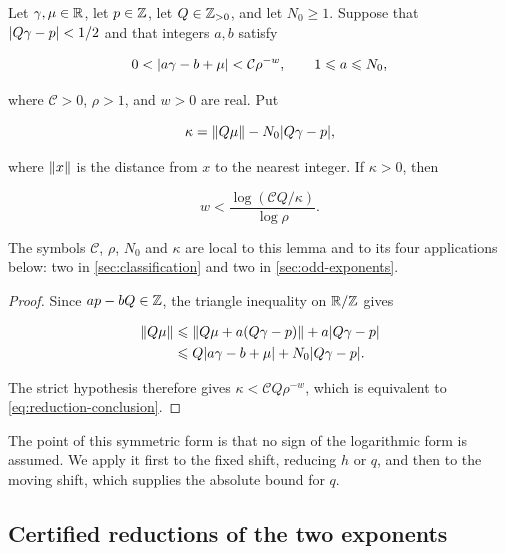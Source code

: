 \begin{lemma}
\label{lem:absolute-reduction}
Let $\gamma,\mu\in\mathbb{R}$, let $p\in\mathbb{Z}$, let $Q\in\mathbb{Z}_{>0}$, and let
$N_0\geqslant1$. Suppose that $\lvert Q\gamma-p\rvert<1/2$ and that integers
$a,b$ satisfy

\begin{equation}
 0<\lvert a\gamma-b+\mu\rvert<\mathcal C\rho^{-w},
 \qquad
 1\leqslant a\leqslant N_0,
 \label{eq:reduction-hypothesis}
\end{equation}

where $\mathcal C>0$, $\rho>1$, and $w>0$ are real. Put

\begin{equation}
 \kappa=\left\lVert Q\mu\right\rVert-N_0\lvert Q\gamma-p\rvert,
 \label{eq:eta}
\end{equation}

where $\left\lVert x\right\rVert$ is the distance from $x$ to the nearest integer. If
$\kappa>0$, then

\begin{equation}
 w<\frac{\log(\mathcal CQ/\kappa)}{\log\rho}.
 \label{eq:reduction-conclusion}
\end{equation}

The symbols $\mathcal C$, $\rho$, $N_0$ and $\kappa$ are local to this lemma
and to its four applications below: two in \cref{sec:classification} and two
in \cref{sec:odd-exponents}.
\end{lemma}

\begin{proof}
Since $ap-bQ\in\mathbb{Z}$, the triangle inequality on $\mathbb{R}/\mathbb{Z}$ gives

\begin{align}
 \left\lVert Q\mu\right\rVert
 &\leqslant
 \left\lVert Q\mu+a(Q\gamma-p)\right\rVert+a\lvert Q\gamma-p\rvert\notag\\
 &\leqslant
 Q\lvert a\gamma-b+\mu\rvert+N_0\lvert Q\gamma-p\rvert.
\end{align}

The strict hypothesis therefore gives $\kappa<\mathcal CQ\rho^{-w}$, which
is equivalent to \cref{eq:reduction-conclusion}.
\end{proof}

The point of this symmetric form is that no sign of the logarithmic form is
assumed. We apply it first to the fixed shift, reducing $h$ or $q$, and then
to the moving shift, which supplies the absolute bound for $q$.

\subsection{Certified reductions of the two exponents}

